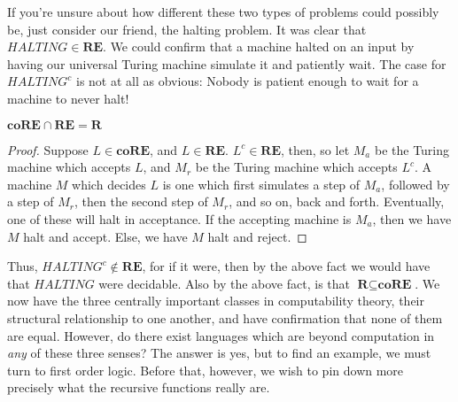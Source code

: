 \par If you're unsure about how different these two types of problems could possibly be, just consider our friend, the halting problem. It was clear that $HALTING \in \textbf{RE}$. We could confirm that a machine halted on an input by having our universal Turing machine simulate it and patiently wait. The case for $HALTING^c$ is not at all as obvious: Nobody is patient enough to wait for a machine to never halt! 
\begin{fact}
    $\textbf{coRE} \cap \textbf{RE} = \textbf{R}$
\end{fact}
\begin{proof}
    Suppose $L \in \textbf{coRE}$, and $L \in \textbf{RE}$. $L^c \in \textbf{RE}$, then, so let $M_a$ be the Turing machine which accepts $L$, and $M_r$ be the Turing machine which accepts $L^c$. A machine $M$ which decides $L$ is one which first simulates a step of $M_a$, followed by a step of $M_r$, then the second step of $M_r$, and so on, back and forth. Eventually, one of these will halt in acceptance. If the accepting machine is $M_a$, then we have $M$ halt and accept. Else, we have $M$ halt and reject.
\end{proof}
Thus, $HALTING^c \notin \textbf{RE}$, for if it were, then by the above fact we would have that $HALTING$ were decidable. Also by the above fact, is that $\textbf{R} \subseteq \textbf{coRE}$. We now have the three centrally important classes in computability theory, their structural relationship to one another, and have confirmation that none of them are equal. However, do there exist languages which are beyond computation in \textit{any} of these three senses? The answer is yes, but to find an example, we must turn to first order logic. Before that, however, we wish to pin down more precisely what the recursive functions really are. 


